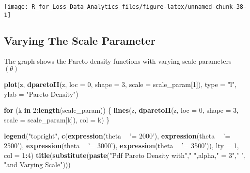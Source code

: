\documentclass[]{book}
\newenvironment{Shaded}{\begin{snugshade}}{\end{snugshade}}
\newcommand{\KeywordTok}[1]{\textcolor[rgb]{0.13,0.29,0.53}{\textbf{#1}}}
\newcommand{\DataTypeTok}[1]{\textcolor[rgb]{0.13,0.29,0.53}{#1}}
\newcommand{\DecValTok}[1]{\textcolor[rgb]{0.00,0.00,0.81}{#1}}
\newcommand{\StringTok}[1]{\textcolor[rgb]{0.31,0.60,0.02}{#1}}
\newcommand{\ControlFlowTok}[1]{\textcolor[rgb]{0.13,0.29,0.53}{\textbf{#1}}}
\newcommand{\OperatorTok}[1]{\textcolor[rgb]{0.81,0.36,0.00}{\textbf{#1}}}
\newcommand{\NormalTok}[1]{#1}
\theoremstyle{definition}
\theoremstyle{definition}
\theoremstyle{definition}
\theoremstyle{remark}
\begin{document}
\begin{center}\texttt{[image: R\_for\_Loss\_Data\_Analytics\_files/figure-latex/unnamed-chunk-38-1]} \end{center}

\subsection{Varying The Scale
Parameter}\label{varying-the-scale-parameter-1}

The graph shows the Pareto density functions with varying scale
parameters \((\theta)\)

\begin{Shaded}
\begin{Highlighting}[]
\KeywordTok{plot}\NormalTok{(z, }\KeywordTok{dparetoII}\NormalTok{(z, }\DataTypeTok{loc =} \DecValTok{0}\NormalTok{, }\DataTypeTok{shape =} \DecValTok{3}\NormalTok{, }\DataTypeTok{scale =}\NormalTok{ scale_param[}\DecValTok{1}\NormalTok{]), }
     \DataTypeTok{type =} \StringTok{"l"}\NormalTok{, }\DataTypeTok{ylab =} \StringTok{"Pareto Density"}\NormalTok{)}

\ControlFlowTok{for}\NormalTok{ (k }\ControlFlowTok{in} \DecValTok{2}\OperatorTok{:}\KeywordTok{length}\NormalTok{(scale_param)) \{}
  \KeywordTok{lines}\NormalTok{(z, }\KeywordTok{dparetoII}\NormalTok{(z, }\DataTypeTok{loc =} \DecValTok{0}\NormalTok{, }\DataTypeTok{shape =} \DecValTok{3}\NormalTok{, }\DataTypeTok{scale =}\NormalTok{ scale_param[k]), }\DataTypeTok{col =}\NormalTok{ k)}
\NormalTok{\}}

\KeywordTok{legend}\NormalTok{(}\StringTok{"topright"}\NormalTok{, }\KeywordTok{c}\NormalTok{(}\KeywordTok{expression}\NormalTok{(theta }\OperatorTok{~}\StringTok{ '= 2000'}\NormalTok{), }\KeywordTok{expression}\NormalTok{(theta }\OperatorTok{~}\StringTok{ '= 2500'}\NormalTok{), }
                     \KeywordTok{expression}\NormalTok{(theta }\OperatorTok{~}\StringTok{ '= 3000'}\NormalTok{), }\KeywordTok{expression}\NormalTok{(theta }\OperatorTok{~}\StringTok{ '= 3500'}\NormalTok{)), }
       \DataTypeTok{lty =} \DecValTok{1}\NormalTok{, }\DataTypeTok{col =} \DecValTok{1}\OperatorTok{:}\DecValTok{4}\NormalTok{)}
\KeywordTok{title}\NormalTok{(}\KeywordTok{substitute}\NormalTok{(}\KeywordTok{paste}\NormalTok{(}\StringTok{"Pdf Pareto Density with"}\NormalTok{,}\StringTok{" "}\NormalTok{,alpha,}\StringTok{" = 3"}\NormalTok{,}\StringTok{" "}\NormalTok{, }
                       \StringTok{"and Varying Scale"}\NormalTok{)))}
\end{Highlighting}
\end{Shaded}
\end{document}
